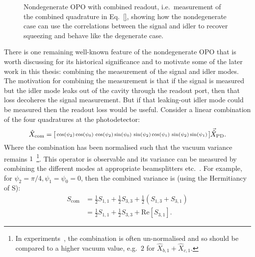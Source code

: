 \begin{figure}
	\centering
	\caption{Nondegenerate OPO with combined readout, i.e.\ measurement of the combined quadrature in Eq.~\ref{}, showing how the nondegenerate case can use the correlations between the signal and idler to recover squeezing and behave like the degenerate case.}
	\label{fig:nOPO_combined_readout}
\end{figure}

There is one remaining well-known feature of the nondegenerate OPO that is worth discussing for its historical significance and to motivate some of the later  work in this thesis: combining the measurement of the signal and idler modes. The motivation for combining the measurement is that if the signal is measured but the idler mode leaks out of the cavity through the readout port, then that loss decoheres the signal measurement. But if that leaking-out idler mode could be measured then the readout loss would be useful. Consider a linear combination of the four quadratures at the photodetector: \begin{equation}\hat X_\text{com}=\begin{bsmallmatrix}\cos(\psi_2)\cos(\psi_0) & \cos(\psi_2)\sin(\psi_0) & \sin(\psi_2)\cos(\psi_1) & \sin(\psi_2)\sin(\psi_1)\end{bsmallmatrix}\vec{\hat X}_\text{PD}.\end{equation} 
Where the combination has been normalised such that the vacuum variance remains $1$~\footnote{In experiments~\cite{Schori2001}, the combination is often un-normalised and so should be compared to a higher vacuum value, e.g.\ $2$ for $\hat X_{b,1} + \hat X_{c,1}$.}. This operator is observable and its variance can be measured by combining the different modes at appropriate beamsplitters etc.~\cite{Schori2001}.  For example, for $\psi_2=\pi/4,\psi_1=\psi_0=0$, then the combined variance is (using the Hermitiancy of $\text{S}$):
\begin{align}\label{eq:Scom_nOPO_eg}
S_\text{com}&=\frac{1}{2}S_{1,1}+\frac{1}{2}S_{3,3}+\frac{1}{2}(S_{1,3}+S_{3,1})\\
&=\frac{1}{2}S_{1,1}+\frac{1}{2}S_{3,3}+\text{Re}[S_{3,1}].\end{align} 
